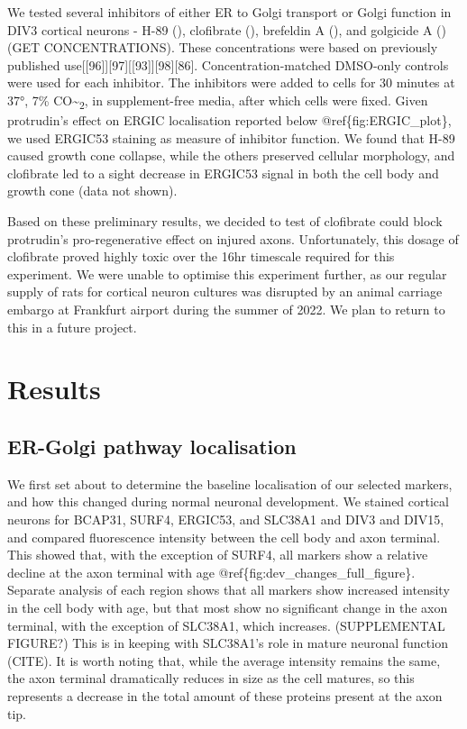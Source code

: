 \documentclass[
  12pt,
  a4paper,
]{book}
\begin{document}
We tested several inhibitors of either ER to Golgi transport or Golgi function in DIV3 cortical neurons - H-89 (), clofibrate (), brefeldin A (), and golgicide A () (GET CONCENTRATIONS). These concentrations were based on previously published use{[}{[}96{]}{]}{[}97{]}{[}{[}93{]}{]}{[}98{]}{[}86{]}. Concentration-matched DMSO-only controls were used for each inhibitor. The inhibitors were added to cells for 30 minutes at 37°, 7\% CO\textasciitilde{}\textsubscript{2}, in supplement-free media, after which cells were fixed. Given protrudin's effect on ERGIC localisation reported below @ref\{fig:ERGIC\_plot\}, we used ERGIC53 staining as measure of inhibitor function. We found that H-89 caused growth cone collapse, while the others preserved cellular morphology, and clofibrate led to a sight decrease in ERGIC53 signal in both the cell body and growth cone (data not shown).

Based on these preliminary results, we decided to test of clofibrate could block protrudin's pro-regenerative effect on injured axons. Unfortunately, this dosage of clofibrate proved highly toxic over the 16hr timescale required for this experiment. We were unable to optimise this experiment further, as our regular supply of rats for cortical neuron cultures was disrupted by an animal carriage embargo at Frankfurt airport during the summer of 2022. We plan to return to this in a future project.

\hypertarget{results-2}{%
\section{Results}\label{results-2}}

\hypertarget{er-golgi-pathway-localisation}{%
\subsection{ER-Golgi pathway localisation}\label{er-golgi-pathway-localisation}}

We first set about to determine the baseline localisation of our selected markers, and how this changed during normal neuronal development. We stained cortical neurons for BCAP31, SURF4, ERGIC53, and SLC38A1 and DIV3 and DIV15, and compared fluorescence intensity between the cell body and axon terminal. This showed that, with the exception of SURF4, all markers show a relative decline at the axon terminal with age @ref\{fig:dev\_changes\_full\_figure\}. Separate analysis of each region shows that all markers show increased intensity in the cell body with age, but that most show no significant change in the axon terminal, with the exception of SLC38A1, which increases. (SUPPLEMENTAL FIGURE?) This is in keeping with SLC38A1's role in mature neuronal function (CITE). It is worth noting that, while the average intensity remains the same, the axon terminal dramatically reduces in size as the cell matures, so this represents a decrease in the total amount of these proteins present at the axon tip.
\end{document}
